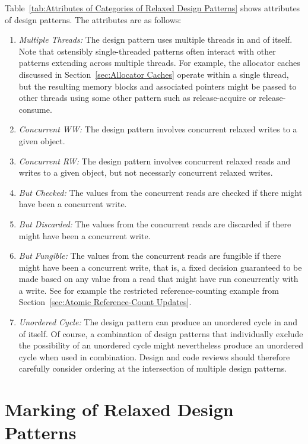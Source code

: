 \documentclass[10]{article}
\begin{document}
Table~\ref{tab:Attributes of Categories of Relaxed Design Patterns}
shows attributes of design patterns.
The attributes are as follows:

\begin{enumerate}
\item	\emph{Multiple Threads:}  The design pattern uses multiple threads
	in and of itself.
	Note that ostensibly single-threaded patterns often interact
	with other patterns extending across multiple threads.
	For example, the allocator caches discussed in
	Section~\ref{sec:Allocator Caches}
	operate within a single thread, but the resulting memory blocks
	and associated pointers might be passed to other threads using
	some other pattern such as release-acquire or release-consume.
\item	\emph{Concurrent WW:}  The design pattern involves concurrent
	relaxed writes to a given object.
\item	\emph{Concurrent RW:}  The design pattern involves concurrent
	relaxed reads and writes to a given object, but not necessarly
	concurrent relaxed writes.
\item	\emph{But Checked:}  The values from the concurrent reads are
	checked if there might have been a concurrent write.
\item	\emph{But Discarded:}  The values from the concurrent reads are
	discarded if there might have been a concurrent write.
\item	\emph{But Fungible:}  The values from the concurrent reads are
	fungible if there might have been a concurrent write,
	that is, a fixed decision guaranteed to be made based on any
	value from a read that might have run concurrently with a write.
	See for example the restricted reference-counting example from
	Section~\ref{sec:Atomic Reference-Count Updates}.
\item	\emph{Unordered Cycle:}  The design pattern can produce an
	unordered cycle in and of itself.
	Of course, a combination of design patterns that individually
	exclude the possibility of an unordered cycle might nevertheless
	produce an unordered cycle when used in combination.
	Design and code reviews should therefore carefully consider
	ordering at the intersection of multiple design patterns.
\end{enumerate}

\section{Marking of Relaxed Design Patterns}
\label{sec:Marking of Relaxed Design Patterns}
\end{document}
